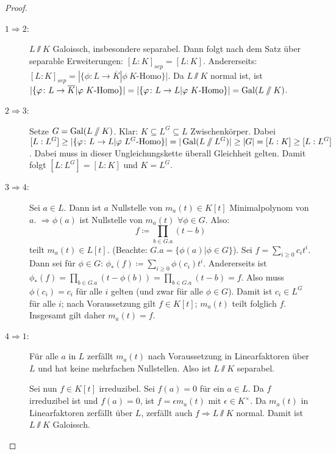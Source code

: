 \documentclass[12pt,a4paper]{scrartcl}
\begin{document}
\begin{proof}
	\leavevmode
	\begin{description}
		\item[$1\Rightarrow2$:] $L\sslash K$ Galoissch, insbesondere separabel. Dann folgt nach dem Satz über separable Erweiterungen: $[L:K]_{sep} = [L:K]$. Andererseits: $[L:K]_{sep} = |\{\phi\colon L\to \overline{K}|\phi\ K\text{-Homo}\}|$. Da $L\sslash K$ normal ist, ist $|\{\phi\colon L\to \overline{K}|\phi\ K\text{-Homo}\}| = |\{\phi\colon L\to L|\phi\ K\text{-Homo}\}| = \Gal(L\sslash K)$.
		\item[$2\Rightarrow 3$:] Setze $G = \operatorname{Gal}(L\sslash K)$. Klar: $K\subseteq L^G\subseteq L$ Zwischenkörper. Dabei $[L:L^G] \geq |\{\varphi\colon L\to L|\varphi\ L^G\text{-Homo}\}| = |\operatorname{Gal}(L\sslash L^G)|\geq |G| = [L:K]\geq [L:L^G]$. Dabei muss in dieser Ungleichungskette überall Gleichheit gelten. Damit folgt $[L:L^G] = [L:K]$ und $K = L^G$.
		\item[$3\Rightarrow 4$:] Sei $a\in L$. Dann ist $a$ Nullstelle von $m_a(t)\in K[t]$ Minimalpolynom von $a$. $\Rightarrow \phi(a)$ ist Nullstelle von $m_a(t)$ $\forall \phi\in G$. Also:
		$$f\coloneqq \prod_{b\in G.a}(t-b)$$
	 	teilt $m_a(t)\in L[t]$. (Beachte: $G.a = \{\phi(a)|\phi\in G\}$). Sei $f = \sum_{i\geq 0}c_it^i$. Dann sei für $\phi\in G$: $\phi_*(f)\coloneqq \sum_{i\geq 0} \phi(c_i)t^i$. Andererseits ist $\phi_*(f) = \prod_{b\in G.a}(t-\phi(b)) = \prod_{b\in G.a}(t-b) = f$. Also muss $\phi(c_i) = c_i$ für alle $i$ gelten (und zwar für alle $\phi\in G$). Damit ist $c_i\in L^G$ für alle $i$; nach Voraussetzung gilt $f\in K[t]$; $m_a(t)$ teilt folglich $f$. Insgesamt gilt daher $m_a(t) = f$.
		\item[$4\Rightarrow 1$:] Für alle $a$ in $L$ zerfällt $m_a(t)$ nach Voraussetzung in Linearfaktoren über $L$ und hat keine mehrfachen Nullstellen. Also ist $L\sslash K$ separabel.
		
		Sei nun $f\in K[t]$ irreduzibel. Sei $f(a) = 0$ für ein $a\in L$. Da $f$ irreduzibel ist und $f(a)=0$, ist $f = \epsilon m_a(t)$ mit $\epsilon\in K^{\times}$. Da $m_a(t)$ in Linearfaktoren zerfällt über $L$, zerfällt auch $f\Rightarrow L\sslash K$ normal. Damit ist $L\sslash K$ Galoissch. 
	\end{description}

\end{proof}
\end{document}
